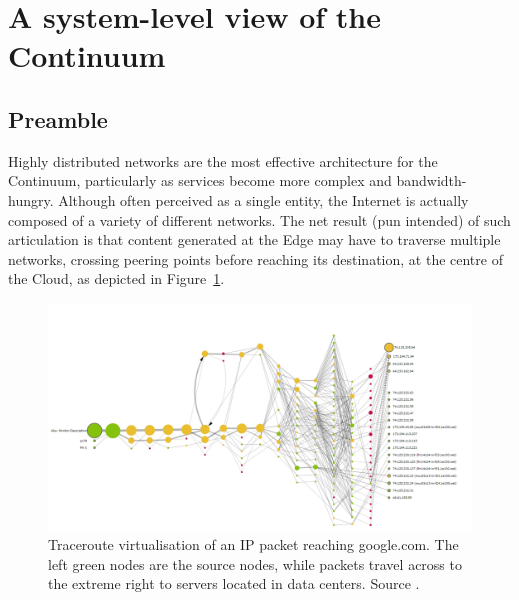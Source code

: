 \section{A system-level view of the Continuum}
\label{sec:technicals}

\subsection{Preamble}
Highly distributed networks are the most effective architecture for the Continuum, particularly as services become more complex and bandwidth-hungry. Although often perceived as a single entity, the Internet is actually composed of a variety of different networks. 
The net result (pun intended) of such articulation is that content generated at the Edge may have to traverse multiple networks, crossing peering points before reaching its destination, at the centre of the Cloud, as depicted in Figure~\ref{fig:traceroute}.

\begin{figure}[ht]
\centering
\includegraphics[width=\columnwidth]{figures/traceroute}
\caption{Traceroute virtualisation of an IP packet reaching google.com. The left green nodes are the source nodes, while packets travel across to the extreme right to servers located in data centers. Source \cite{traceroute}.}
\label{fig:traceroute}
\end{figure}


